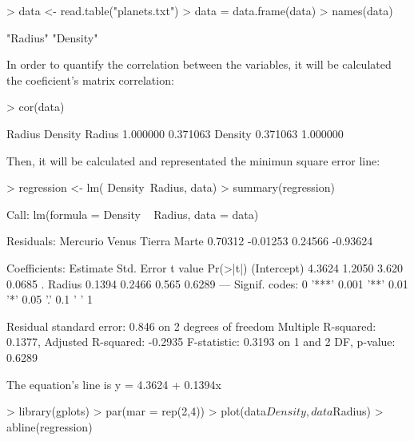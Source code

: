 \documentclass[a4paper]{article}
\begin{document}
\begin{Schunk}
\begin{Sinput}
> data <- read.table("planets.txt")
> data = data.frame(data)
> names(data)
\end{Sinput}
\begin{Soutput}
[1] "Radius"  "Density"
\end{Soutput}
\end{Schunk}

In order to quantify the correlation between the variables, it will be calculated the coeficient's matrix correlation:

\begin{Schunk}
\begin{Sinput}
> cor(data)
\end{Sinput}
\begin{Soutput}
          Radius  Density
Radius  1.000000 0.371063
Density 0.371063 1.000000
\end{Soutput}
\end{Schunk}

Then, it will be calculated and representated the minimun square error line:
\begin{Schunk}
\begin{Sinput}
> regression <- lm( Density~Radius, data)
> summary(regression)
\end{Sinput}
\begin{Soutput}
Call:
lm(formula = Density ~ Radius, data = data)

Residuals:
Mercurio    Venus   Tierra    Marte 
 0.70312 -0.01253  0.24566 -0.93624 

Coefficients:
            Estimate Std. Error t value Pr(>|t|)  
(Intercept)   4.3624     1.2050   3.620   0.0685 .
Radius        0.1394     0.2466   0.565   0.6289  
---
Signif. codes:  0 '***' 0.001 '**' 0.01 '*' 0.05 '.' 0.1 ' ' 1

Residual standard error: 0.846 on 2 degrees of freedom
Multiple R-squared:  0.1377,	Adjusted R-squared:  -0.2935 
F-statistic: 0.3193 on 1 and 2 DF,  p-value: 0.6289
\end{Soutput}
\end{Schunk}

The equation's line is y = 4.3624 + 0.1394x

\begin{Schunk}
\begin{Sinput}
> library(gplots)
> par(mar = rep(2,4))
> plot(data$Density, data$Radius)
> abline(regression)
\end{Sinput}
\end{Schunk}
\end{document}
